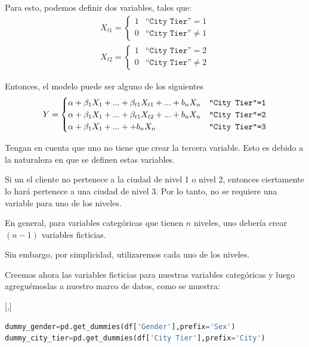 Para esto, podemos definir dos variables, tales que:
\begin{align}
 X_{t1}=
 \begin{cases}
  1 & \texttt{``City Tier''}=1 \\
  0 & \texttt{``City Tier''}\neq 1
 \end{cases}
 \end{align}
 \begin{align}
 X_{t2}=
 \begin{cases}
  1 & \texttt{``City Tier''}=2 \\
  0 & \texttt{``City Tier''}\neq 2
 \end{cases}
\end{align}


Entonces, el modelo puede ser alguno de los siguientes
\begin{align}
 Y=
 \begin{cases}
  \alpha + \beta_{1}X_{1}+...+\beta_{t1}X_{t1}+...+b_{n}X_{n} & \texttt{``City Tier''=1}\\
  \alpha + \beta_{1}X_{1}+...+\beta_{t1}X_{t2}+...+b_{n}X_{n} & \texttt{``City Tier''=2}\\
  \alpha + \beta_{1}X_{1}+...++b_{n}X_{n} & \texttt{``City Tier''=3}\\
 \end{cases}
\end{align}


Tengan en cuenta que uno no tiene que crear la tercera variable. Esto es
debido a la naturaleza en que se definen estas variables.


Si un
el cliente no pertenece a la ciudad de nivel 1 o nivel 2, entonces ciertamente lo hará
pertenece a una ciudad de nivel 3. Por lo tanto, no se requiere una variable para uno de
los niveles.


\begin{rem}
 En general, para variables categóricas que tienen $n$ niveles, uno
debería crear $(n-1)$ variables ficticias.
\end{rem}

Sin embargo, por simplicidad, utilizaremos cada uno de los niveles.


Creemos ahora las variables ficticias para nuestras
variables categóricas y luego agreguémoslas a nuestro marco de datos, como se muestra:


[,]{}

\begin{lstlisting}[language=Python]
dummy_gender=pd.get_dummies(df['Gender'],prefix='Sex')
dummy_city_tier=pd.get_dummies(df['City Tier'],prefix='City')
\end{lstlisting}


